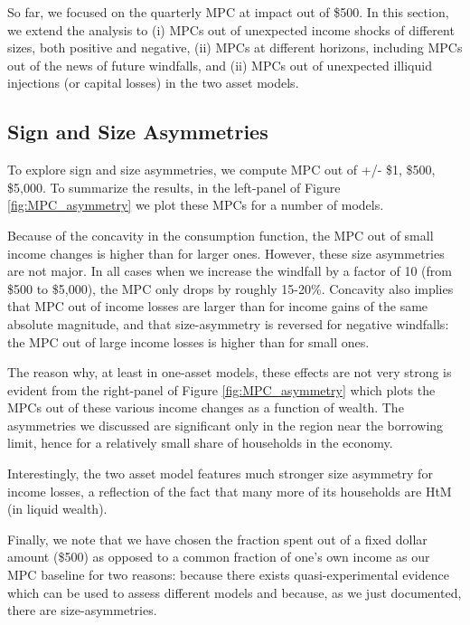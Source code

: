 \label{sec:other_mpcs}
So far, we focused on the quarterly MPC at impact out of \$500. In this section, we extend the analysis to (i) MPCs out of unexpected income shocks of different sizes, both positive and negative, (ii) MPCs at different horizons, including MPCs out of the news of future windfalls, and (ii) MPCs out of unexpected illiquid injections (or capital losses) in the two asset models.

\subsection{Sign and Size Asymmetries}
\label{sec:other_mpcs_size}
To explore sign and size asymmetries, we compute MPC out of +/- \$1, \$500, \$5,000. To summarize the results, in the left-panel of Figure \ref{fig:MPC_asymmetry} we plot these MPCs for a number of models.

Because of the concavity in the consumption function, the MPC out of small income changes is higher than for larger ones. However, these size asymmetries are not major. In all cases when we increase the windfall by a factor of 10 (from \$500 to \$5,000), the MPC only drops by roughly 15-20\%. Concavity also implies that MPC out of income losses are larger than for income gains of the same absolute magnitude, and that size-asymmetry is reversed for negative windfalls: the MPC out of large income losses is higher than for small ones. 

The reason why, at least in one-asset models, these effects are not very strong is evident from the right-panel of Figure \ref{fig:MPC_asymmetry} which plots the MPCs out of these various income changes as a function of wealth. The asymmetries we discussed are significant only in the region near the borrowing limit, hence for a relatively small share of households in the economy.

Interestingly, the two asset model features much stronger size asymmetry for income losses, a reflection of the fact that many more of its households are HtM (in liquid wealth). 

Finally, we note that we have chosen the fraction spent out of a fixed dollar amount (\$500) as opposed to a common fraction of one's own income as our MPC baseline for two reasons: because there exists quasi-experimental evidence which can be used to assess different models and because, as we just documented, there are size-asymmetries. 

